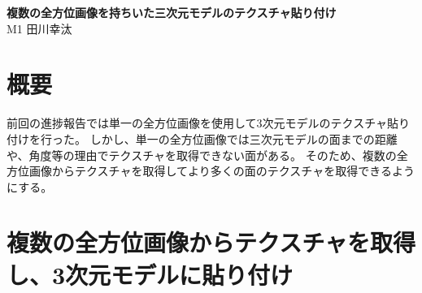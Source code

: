 \documentclass[]{jarticle}          %
\begin{document}

\vspace*{2ex}
\begin{center}
 {\Large \bf 複数の全方位画像を持ちいた三次元モデルのテクスチャ貼り付け}\\ %
 \vspace*{5mm}
 {\large M1 田川幸汰}%
\end{center}





\section{概要}
前回の進捗報告では単一の全方位画像を使用して3次元モデルのテクスチャ貼り付けを行った。
しかし、単一の全方位画像では三次元モデルの面までの距離や、角度等の理由でテクスチャを取得できない面がある。
そのため、複数の全方位画像からテクスチャを取得してより多くの面のテクスチャを取得できるようにする。

\section{複数の全方位画像からテクスチャを取得し、3次元モデルに貼り付け}
\end{document}
